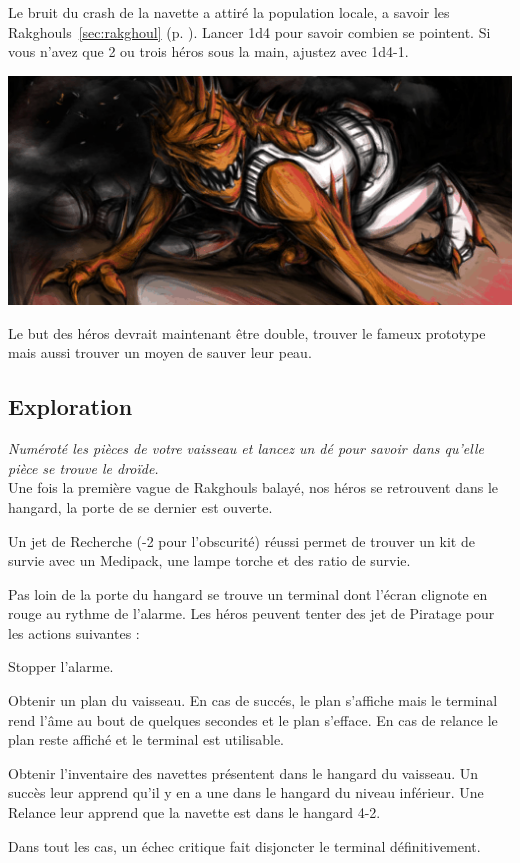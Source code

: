 \documentclass{jdrp}
\begin{document}
Le bruit du crash de la navette a attiré la population locale, a savoir les Rakghouls~\ref{sec:rakghoul} (p. \pageref{sec:rakghoul}). Lancer 1d4 pour savoir combien se pointent. Si vous n'avez que 2 ou trois héros sous la main, ajustez avec 1d4-1.

\noindent\includegraphics[width=\linewidth]{img/scenario/rakghoul.png}

Le but des héros devrait maintenant être double, trouver le fameux prototype mais aussi trouver un moyen de sauver leur peau. 

\subsection{Exploration}
\emph{Numéroté les pièces de votre vaisseau et lancez un dé pour savoir dans qu'elle pièce se trouve le droïde.}\\

Une fois la première vague de Rakghouls balayé, nos héros se retrouvent dans le hangard, la porte de se dernier est ouverte.

Un jet de Recherche (-2 pour l'obscurité) réussi permet de trouver un kit de survie avec un Medipack, une lampe torche et des ratio de survie.

Pas loin de la porte du hangard se trouve un terminal dont l'écran clignote en rouge au rythme de l'alarme. Les héros peuvent tenter des jet de Piratage pour les actions suivantes :
\begin{rebelist}
	\item Stopper l'alarme. 
	\item Obtenir un plan du vaisseau. En cas de succés, le plan s'affiche mais le terminal rend l'âme au bout de quelques secondes et le plan s'efface. En cas de relance le plan reste affiché et le terminal est utilisable.
	\item  Obtenir l'inventaire des navettes présentent dans le hangard du vaisseau. Un succès leur apprend qu'il y en a une dans le hangard du niveau inférieur. Une Relance leur apprend que la navette est dans le hangard 4-2.
\end{rebelist}
Dans tout les cas, un échec critique fait disjoncter le terminal définitivement.
\end{document}
